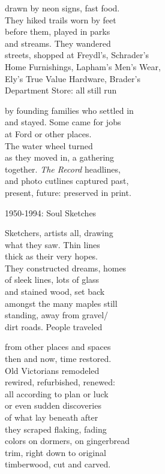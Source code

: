 \documentclass[twoside,10pt]{book}
\begin{document}
drawn by neon signs, fast food.\\
They hiked trails worn by feet\\
before them, played in parks\\
and streams. They wandered\\
streets, shopped at Freydl's, Schrader's\\
Home Furnishings, Lapham's Men's Wear,\\
Ely's True Value Hardware, Brader's\\
Department Store: all still run

by founding families who settled in\\
and stayed. Some came for jobs\\
at Ford or other places.\\
The water wheel turned\\
as they moved in, a gathering\\
together. \emph{The Record} headlines,\\
and photo cutlines captured past,\\
present, future: preserved in print.


1950-1994: Soul Sketches

Sketchers, artists all, drawing\\
what they saw. Thin lines\\
thick as their very hopes.\\
They constructed dreams, homes\\
of sleek lines, lots of glass\\
and stained wood, set back\\
amongst the many maples still\\
standing, away from gravel/\\
dirt roads. People traveled

from other places and spaces\\
then and now, time restored.\\
Old Victorians remodeled\\
rewired, refurbished, renewed:\\
all according to plan or luck\\
or even sudden discoveries\\
of what lay beneath after\\
they scraped flaking, fading\\
colors on dormers, on gingerbread\\
trim, right down to original\\
timberwood, cut and carved.
\end{document}
